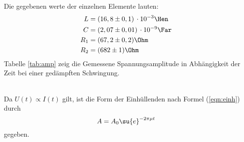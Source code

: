 Die gegebenen werte der einzelnen Elemente lauten:
\begin{align*}
  L &= (16,8 \pm 0,1) \,\cdot 10^{-3}\Hen \\
  C &= (2,07 \pm 0,01) \,\cdot 10^{-9} \Far \\
  R_1 &= (67,2 \pm 0,2) \Ohm \\
  R_2 &= (682 \pm 1) \Ohm
\end{align*}
Tabelle \ref{tab:amp} zeig die Gemessene Spannungsamplitude in Abhängigkeit der Zeit bei
einer gedämpften Schwingung.

\\
Da $U(t)\propto I(t)$ gilt, ist die Form der Einhüllenden nach Formel
(\ref{eqn:einh}) durch
\begin{equation}
  A = A_0\su{e}^{-2\pi\mu t}
\end{equation}
gegeben.
